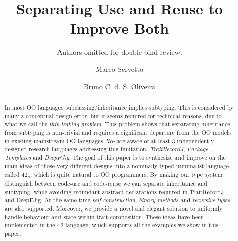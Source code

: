 \documentclass[a4paper,UKenglish]{lipics-v2016}
\title{Separating Use and Reuse to Improve Both}
\author{Authors omitted for double-bind review.}
\author{Marco Servetto\inst{1} \and Bruno C. d. S. Oliveira\inst{2}}
\institute{Victoria University of Wellington, New Zealand,\\
\and
The University of Hong Kong, Hong Kong\\}
\newcommand\saveSpace{}
\newcommand\name{{\bf $42_{\mu}$}\xspace}
\begin{document}
\maketitle

\begin{abstract}
\saveSpace\saveSpace\saveSpace
In most OO languages subclassing/inheritance implies
subtyping. This is considered by many a conceptual design error, but it
seems required for technical reasons, due to what we call the
\emph{this-leaking problem}. This problem shows that separating
inheritance from subtyping is non-trivial and requires a significant
departure from the OO models in existing mainstream OO languages.
We are aware of at least 3 independently designed research languages 
addressing this limitation: \emph{TraitRecordJ}, \emph{Package Templates} and \emph{DeepFJig}.
The goal of this paper is to synthesize and improve on
the main ideas of those very different designs into a nominally typed
minimalist language, called \name, which is quite
natural to OO programmers.
By making our type system distinguish between code-use and code-reuse
we can separate inheritance and subtyping, while avoiding 
redundant abstract declarations required in TraitRecordJ and
DeepFJig. At the same time \emph{self construction},
\emph{binary methods} and \emph{recursive types} are also supported.
Moreover, we provide a novel and elegant solution to uniformly
handle behaviour and state within trait composition.
These ideas have been implemented in the 42 language, 
which supports all the examples we show in this paper.
\saveSpace\saveSpace\saveSpace

\saveSpace\saveSpace\saveSpace
\end{abstract}


















\end{document}
